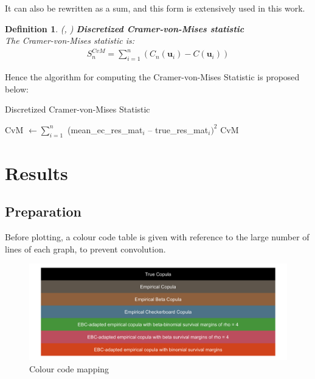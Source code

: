 \documentclass[12pt]{report}
\newtheorem{definition}{Definition}[subsection]
\newcommand{\1}{\mathbf{1}}
\begin{document}
\begin{flushleft}
It can also be rewritten as a sum, and this form is extensively used in this work.

\begin{definition}\label{CvMStatisticsDiscretized}
\textit{\normalfont(\cite{HofertBook}, \cite{GenestRemillardBeaudoinGOF2009})}\:
\textbf{Discretized Cramer-von-Mises statistic} \\
The Cramer-von-Mises statistic is:
\begin{align*}
S_{n}^{CvM} = \sum\limits_{i = 1}^{n} (C_{n}(\textbf{u}_{i}) - C(\textbf{u}_{i}))
\end{align*}
\end{definition}
Hence the algorithm for computing the Cramer-von-Mises Statistic is proposed below:
\begin{algorithm}[H]
\caption{Discretized Cramer-von-Mises Statistic}
\begin{algorithmic}
    \State CvM $\gets \sum\limits_{i = 1}^{n}$ (mean\_ec\_res\_mat$_{i}$ -- true\_res\_mat$_{i})^{2}$
    \State \Return CvM
\EndProcedure
\end{algorithmic}
\end{algorithm}

\newpage
\section{Results}
\vspace{0.5cm}
\subsection{Preparation}
\vspace{0.5cm}
Before plotting, a colour code table is given with reference to the large number of lines of each graph, to prevent convolution.\\

\begin{figure}[h!]
\centering
\includegraphics[width=17cm]{ColorPalette/ColorPalette.png}
\caption{Colour code mapping}
\end{figure}%


\end{flushleft}
\end{document}
